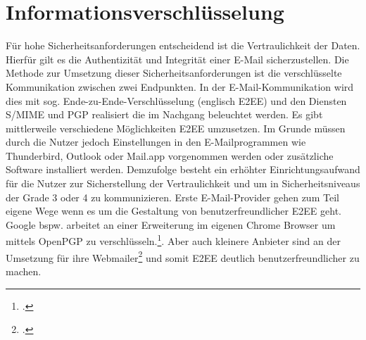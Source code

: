 \documentclass  [paper=a4,
				fontsize=12pt,
				listof=totoc,
				bibliography=totoc
				]{scrreprt}
\begin{document}
		\section{Informationsverschlüsselung}
			Für hohe Sicherheitsanforderungen entscheidend ist die Vertraulichkeit der Daten. Hierfür gilt es die Authentizität und Integrität einer E-Mail sicherzustellen. Die Methode zur Umsetzung dieser Sicherheitsanforderungen ist die verschlüsselte Kommunikation zwischen zwei Endpunkten. In der E-Mail-Kommunikation wird dies mit sog. Ende-zu-Ende-Verschlüsselung (englisch \ac{E2EE}) und den Diensten S/MIME und \ac{PGP} realisiert die im Nachgang beleuchtet werden.
			Es gibt mittlerweile verschiedene Möglichkeiten \ac{E2EE} umzusetzen. Im Grunde müssen durch die Nutzer jedoch Einstellungen in den E-Mailprogrammen wie Thunderbird, Outlook oder Mail.app vorgenommen werden oder zusätzliche Software installiert werden. Demzufolge besteht ein erhöhter Einrichtungsaufwand für die Nutzer zur Sicherstellung der Vertraulichkeit und um in Sicherheitsniveaus der Grade 3 oder 4 zu kommunizieren.\medskip
			Erste E-Mail-Provider gehen zum Teil eigene Wege wenn es um die Gestaltung von benutzerfreundlicher \ac{E2EE} geht. Google bspw. arbeitet an einer Erweiterung im eigenen Chrome Browser um mittels OpenPGP zu verschlüsseln.\footcite[Vgl.][]{Somogyi2013}. Aber auch kleinere Anbieter sind an der Umsetzung für ihre Webmailer\footcite[Vgl.][]{Posteo2013} und somit \ac{E2EE} deutlich benutzerfreundlicher zu machen. 
			
\end{document}
